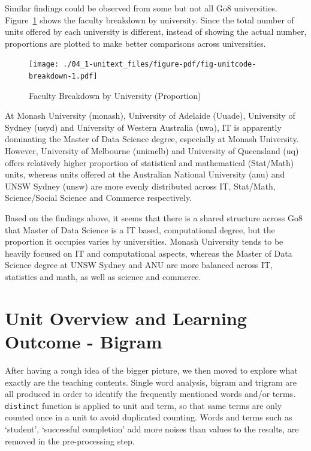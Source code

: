 \documentclass[
  letterpaper,
  DIV=11,
  numbers=noendperiod]{scrreport}
\begin{document}
Similar findings could be observed from some but not all Go8
universities. Figure~\ref{fig-unitcode-breakdown} shows the faculty
breakdown by university. Since the total number of units offered by each
university is different, instead of showing the actual number,
proportions are plotted to make better comparisons across universities.

\begin{figure}

{\centering \texttt{[image: ./04\_1-unitext\_files/figure-pdf/fig-unitcode-breakdown-1.pdf]}

}

\caption{\label{fig-unitcode-breakdown}Faculty Breakdown by University
(Proportion)}

\end{figure}

At Monash University (monash), University of Adelaide (Uuade),
University of Sydney (usyd) and University of Western Australia (uwa),
IT is apparently dominating the Master of Data Science degree,
especially at Monash University. However, University of Melbourne
(unimelb) and University of Queensland (uq) offers relatively higher
proportion of statistical and mathematical (Stat/Math) units, whereas
units offered at the Australian National University (anu) and UNSW
Sydney (unsw) are more evenly distributed across IT, Stat/Math,
Science/Social Science and Commerce respectively.

Based on the findings above, it seems that there is a shared structure
across Go8 that Master of Data Science is a IT based, computational
degree, but the proportion it occupies varies by universities. Monash
University tends to be heavily focused on IT and computational aspects,
whereas the Master of Data Science degree at UNSW Sydney and ANU are
more balanced across IT, statistics and math, as well as science and
commerce.

\hypertarget{sec-unit-bigram}{%
\section{Unit Overview and Learning Outcome -
Bigram}\label{sec-unit-bigram}}

After having a rough idea of the bigger picture, we then moved to
explore what exactly are the teaching contents. Single word analysis,
bigram and trigram are all produced in order to identify the frequently
mentioned words and/or terms. \texttt{distinct} function is applied to
unit and term, so that same terms are only counted once in a unit to
avoid duplicated counting. Words and terms such as `student',
`successful completion' add more noises than values to the results, are
removed in the pre-processing step.
\end{document}
